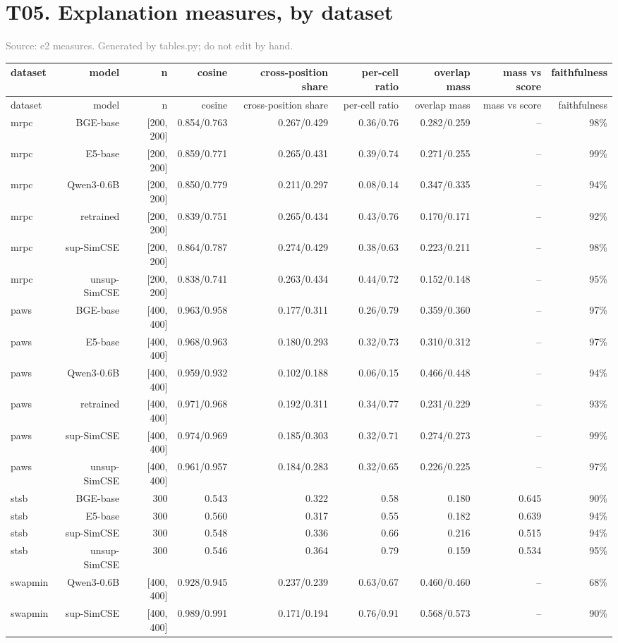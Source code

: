 \documentclass[10pt]{article}
\begin{document}
\section*{T05. Explanation measures, by dataset}
\textcolor{gray}{Source: e2 measures. Generated by tables.py; do not edit by hand.}

\footnotesize
\begin{longtable}{lrrrrrrrr}
\toprule
dataset & model & n & cosine & cross-position share & per-cell ratio & overlap mass & mass vs score & faithfulness \\
\midrule
\endfirsthead
\toprule
dataset & model & n & cosine & cross-position share & per-cell ratio & overlap mass & mass vs score & faithfulness \\
\midrule
\endhead
\bottomrule
\endfoot
mrpc & BGE-base & [200, 200] & 0.854/0.763 & 0.267/0.429 & 0.36/0.76 & 0.282/0.259 & -- & 98\% \\
mrpc & E5-base & [200, 200] & 0.859/0.771 & 0.265/0.431 & 0.39/0.74 & 0.271/0.255 & -- & 99\% \\
mrpc & Qwen3-0.6B & [200, 200] & 0.850/0.779 & 0.211/0.297 & 0.08/0.14 & 0.347/0.335 & -- & 94\% \\
mrpc & retrained & [200, 200] & 0.839/0.751 & 0.265/0.434 & 0.43/0.76 & 0.170/0.171 & -- & 92\% \\
mrpc & sup-SimCSE & [200, 200] & 0.864/0.787 & 0.274/0.429 & 0.38/0.63 & 0.223/0.211 & -- & 98\% \\
mrpc & unsup-SimCSE & [200, 200] & 0.838/0.741 & 0.263/0.434 & 0.44/0.72 & 0.152/0.148 & -- & 95\% \\
paws & BGE-base & [400, 400] & 0.963/0.958 & 0.177/0.311 & 0.26/0.79 & 0.359/0.360 & -- & 97\% \\
paws & E5-base & [400, 400] & 0.968/0.963 & 0.180/0.293 & 0.32/0.73 & 0.310/0.312 & -- & 97\% \\
paws & Qwen3-0.6B & [400, 400] & 0.959/0.932 & 0.102/0.188 & 0.06/0.15 & 0.466/0.448 & -- & 94\% \\
paws & retrained & [400, 400] & 0.971/0.968 & 0.192/0.311 & 0.34/0.77 & 0.231/0.229 & -- & 93\% \\
paws & sup-SimCSE & [400, 400] & 0.974/0.969 & 0.185/0.303 & 0.32/0.71 & 0.274/0.273 & -- & 99\% \\
paws & unsup-SimCSE & [400, 400] & 0.961/0.957 & 0.184/0.283 & 0.32/0.65 & 0.226/0.225 & -- & 97\% \\
stsb & BGE-base & 300 & 0.543 & 0.322 & 0.58 & 0.180 & 0.645 & 90\% \\
stsb & E5-base & 300 & 0.560 & 0.317 & 0.55 & 0.182 & 0.639 & 94\% \\
stsb & sup-SimCSE & 300 & 0.548 & 0.336 & 0.66 & 0.216 & 0.515 & 94\% \\
stsb & unsup-SimCSE & 300 & 0.546 & 0.364 & 0.79 & 0.159 & 0.534 & 95\% \\
swapmin & Qwen3-0.6B & [400, 400] & 0.928/0.945 & 0.237/0.239 & 0.63/0.67 & 0.460/0.460 & -- & 68\% \\
swapmin & sup-SimCSE & [400, 400] & 0.989/0.991 & 0.171/0.194 & 0.76/0.91 & 0.568/0.573 & -- & 90\% \\
\end{longtable}
\normalsize
\end{document}
